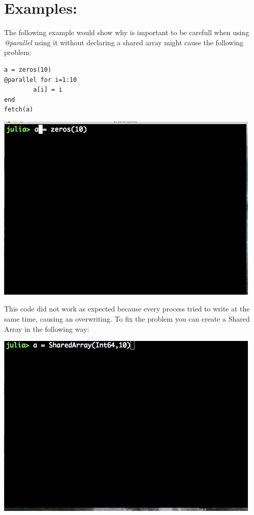 \documentclass[letterpaper,10pt,english]{sphinxmanual}
\begin{document}
\section{Examples:}
\label{JuliaPar:id1}
The following example would show why is important to be carefull when using \emph{@parallel} using it without declaring a shared array might cause the following problem:

\begin{Verbatim}[commandchars=\\\{\}]
a = zeros(10)
@parallel for i=1:10
        a[i] = i
end
fetch(a)
\end{Verbatim}

\includegraphics{parallel.gif}

This code did not work as expected because every process tried to write at the same time, causing an overwriting. To fix the problem you can create a Shared Array in the following way:

\includegraphics{shared.gif}
\end{document}
